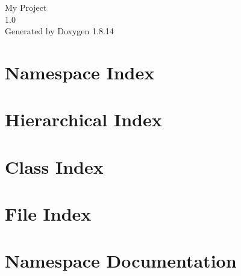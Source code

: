 \documentclass[twoside]{book}
\newcommand{\+}{\discretionary{\mbox{\scriptsize$\hookleftarrow$}}{}{}}
\newcommand{\clearemptydoublepage}{%
  \newpage{\pagestyle{empty}\cleardoublepage}%
}
\begin{document}
\hypersetup{pageanchor=false,
             bookmarksnumbered=true,
             pdfencoding=unicode
            }
\begin{titlepage}
\vspace*{7cm}
\begin{center}%
{\Large My Project \\[1ex]\large 1.\+0 }\\
\vspace*{1cm}
{\large Generated by Doxygen 1.8.14}\\
\end{center}
\end{titlepage}
\clearemptydoublepage
{}
\tableofcontents
\clearemptydoublepage
{}
\hypersetup{pageanchor=true}

\chapter{Namespace Index}

\chapter{Hierarchical Index}

\chapter{Class Index}

\chapter{File Index}

\chapter{Namespace Documentation}














\end{document}
